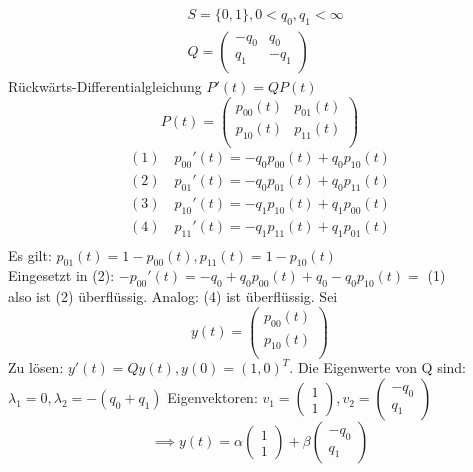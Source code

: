 \documentclass[a4paper,twoside,DIV15,BCOR12mm]{scrbook}
\begin{document}
\begin{beispiel}
  \begin{align*}
    & S=\{0,1\}, 0<q_0,q_1<\infty \\
    & Q=\left(
    \begin{array}{cc}
      -q_0 & q_0 \\
      q_1 & -q_1 \\
    \end{array}
    \right)
  \end{align*}
  Rückwärts-Differentialgleichung $P'(t)=QP(t)$
  \[
  P(t)=\left(
  \begin{array}{cc}
    p_{00}(t) & p_{01}(t) \\
    p_{10}(t) & p_{11}(t) \\
  \end{array}
  \right)
  \]
  \begin{align*}
   (1) \quad p_{00}'(t)=-q_0p_{00}(t)+q_0p_{10}(t) \\
   (2) \quad p_{01}'(t)=-q_0p_{01}(t)+q_0p_{11}(t) \\
   (3) \quad p_{10}'(t)=-q_1p_{10}(t)+q_1p_{00}(t) \\
   (4) \quad p_{11}'(t)=-q_1p_{11}(t)+q_1p_{01}(t) \\    
  \end{align*}
  Es gilt: $p_{01}(t)=1-p_{00}(t), p_{11}(t)=1-p_{10}(t)$ \\
  Eingesetzt in (2): $-p_{00}'(t)=-q_0+q_0p_{00}(t)+q_0-q_0p_{10}(t)=$ (1) \\
  also ist (2) überflüssig. Analog: (4) ist überflüssig. Sei
  \[
  y(t)=\left(
  \begin{array}{c}
    p_{00}(t) \\ p_{10}(t) \\
  \end{array}
  \right) \]
  Zu lösen: $y'(t)=Qy(t), y(0)=(1,0)^T$. Die Eigenwerte von Q sind:
  $\lambda_1=0, \lambda_2=-(q_0+q_1)$ Eigenvektoren:
  $v_1=\begin{pmatrix} 1 \\ 1 \end{pmatrix}, v_2 =\begin{pmatrix} -q_0 \\ q_1 \end{pmatrix}$
  \[
  \implies y(t)=\alpha\begin{pmatrix} 1 \\ 1\end{pmatrix}+\beta\begin{pmatrix} -q_0 \\ q_1 

\end{pmatrix}\]
\end{beispiel}
\end{document}
